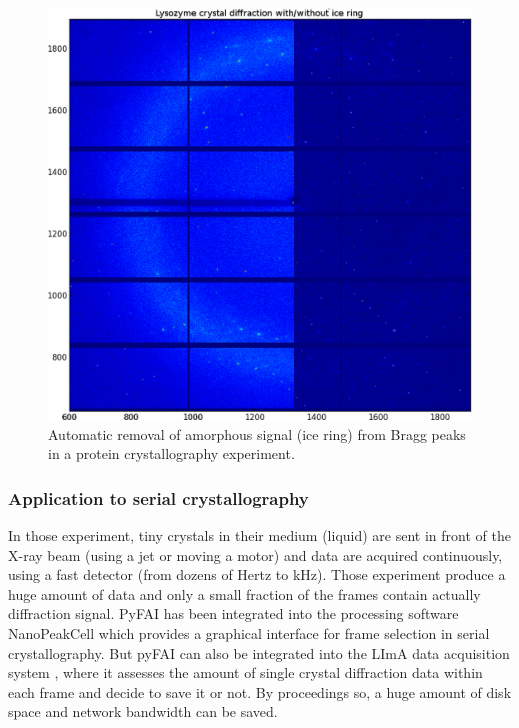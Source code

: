 \documentclass[preprint]{iucr}
\begin{document}
\begin{figure}
\label{separate}
\begin{center}
\includegraphics[width=15cm]{merged.eps}
\caption{Automatic removal of amorphous signal (ice ring) from Bragg peaks in a
protein crystallography experiment.}
\end{center}
\end{figure}

\subsubsection{Application to serial crystallography}
In those experiment, tiny crystals in their medium (liquid) are sent in front of
the X-ray beam (using a jet or moving a motor) and data are acquired
continuously, using a fast detector (from dozens of Hertz to kHz).
Those experiment produce a huge amount of data and only a small fraction of the
frames contain actually diffraction signal.
PyFAI has been integrated into the processing software NanoPeakCell which
provides a graphical interface for frame selection in serial crystallography.
But pyFAI can also be integrated into the LImA data acquisition system
\cite{lima}, where it assesses the amount of single crystal
diffraction data within each frame and decide to save it or not.
By proceedings so, a huge amount of disk space and network bandwidth can be
saved.
\end{document}
